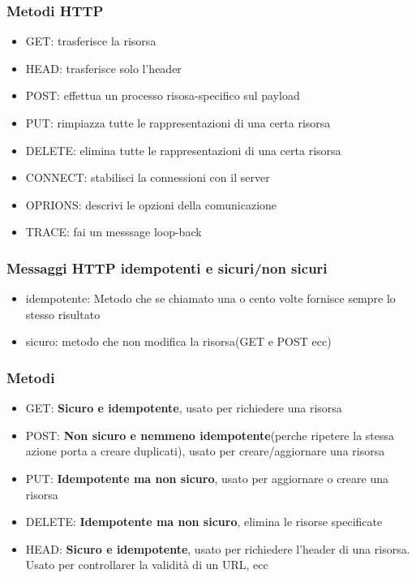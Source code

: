 \subsubsection{Metodi HTTP}
\begin{itemize}
    \item GET: trasferisce la risorsa
    \item HEAD: trasferisce solo l'header
    \item POST: effettua un processo risosa-specifico sul payload
    \item PUT: rimpiazza tutte le rappresentazioni di una certa risorsa
    \item DELETE: elimina tutte le rappresentazioni di una certa risorsa
    \item CONNECT: stabilisci la connessioni con il server
    \item OPRIONS: descrivi le opzioni della comunicazione
    \item TRACE: fai un messsage loop-back
\end{itemize}

\subsubsection{Messaggi HTTP idempotenti e sicuri/non sicuri}
\begin{itemize}
    \item idempotente: Metodo che se chiamato una o cento volte fornisce sempre lo stesso risultato
    \item sicuro: metodo che non modifica la risorsa(GET e POST ecc)
\end{itemize}

\subsubsection{Metodi}
\begin{itemize}
    \item GET: \textbf{Sicuro e idempotente}, usato per richiedere una risorsa
    \item POST: \textbf{Non sicuro e nemmeno idempotente}(perche ripetere la stessa azione porta a creare duplicati), usato per creare/aggiornare una risorsa
    \item PUT: \textbf{Idempotente ma non sicuro}, usato per aggiornare o creare una risorsa
    \item DELETE: \textbf{Idempotente ma non sicuro}, elimina le risorse specificate
    \item HEAD: \textbf{Sicuro e idempotente}, usato per richiedere l'header di una risorsa.
    Usato per controllarer la validità di un URL, ecc
\end{itemize}

